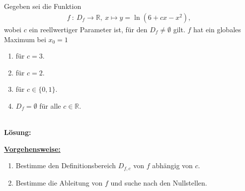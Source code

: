 \newpage



\subsection*{}
Gegeben sei die Funktion
\begin{align*}
f \ : \ D_f \to \mathbb{R}, \ x \mapsto y = \ln(6 +cx -x^2)	,
\end{align*}
wobei $c$ ein reellwertiger Parameter ist, für den $D_f \neq \emptyset$ gilt.
$f$ hat ein globales Maximum bei $x_0=1$
\renewcommand{\labelenumi}{(\alph{enumi})}
\begin{enumerate}
\item für $c=3$.
\item für $c = 2$.
\item für $c \in \lbrace 0, 1\rbrace$.
\item $D_f = \emptyset $ für alle $c \in \mathbb{R}$.
\end{enumerate}
\ \\
\textbf{Lösung:}
\begin{mdframed}
\underline{\textbf{Vorgehensweise:}}
\renewcommand{\labelenumi}{\theenumi.}
\begin{enumerate}
\item Bestimme den Definitionsbereich $D_{f,c}$ von $f$ abhängig von $c$.
\item Bestimme die Ableitung von $f$ und suche nach den Nullstellen.

\end{enumerate}
\end{mdframed}


